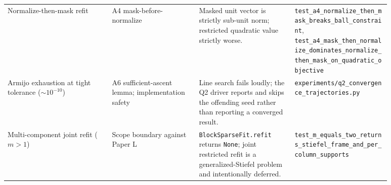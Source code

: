 \begin{table}[t]
\begin{tabular}{p{0.24\linewidth}p{0.20\linewidth}p{0.22\linewidth}p{0.22\linewidth}}
\addlinespace
Normalize-then-mask refit & A4 mask-before-normalize & Masked unit vector is strictly sub-unit norm; restricted quadratic value strictly worse. & \texttt{test\_a4\_normalize\_then\_mask\_breaks\_ball\_constraint}, \texttt{test\_a4\_mask\_then\_normalize\_dominates\_normalize\_then\_mask\_on\_quadratic\_objective} \\
\addlinespace
Armijo exhaustion at tight tolerance ($\sim\!10^{-10}$) & A6 sufficient-ascent lemma; implementation safety & Line search fails loudly; the Q2 driver reports and skips the offending seed rather than reporting a converged result. & \texttt{experiments/q2\_convergence\_trajectories.py} \\
\addlinespace
Multi-component joint refit ($m\!>\!1$) & Scope boundary against Paper L & \texttt{BlockSparseFit.refit} returns \texttt{None}; joint restricted refit is a generalized-Stiefel problem and intentionally deferred. & \texttt{test\_m\_equals\_two\_returns\_stiefel\_frame\_and\_per\_column\_supports} \\
\bottomrule
\end{tabular}
\end{table}
